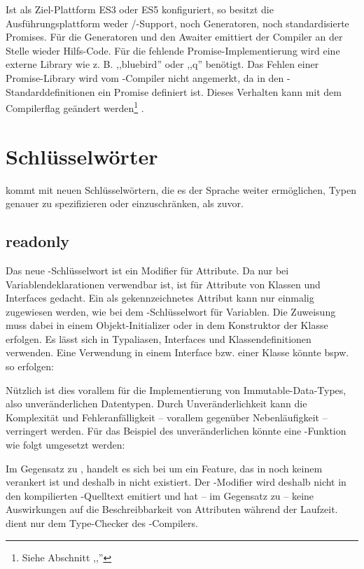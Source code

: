 Ist als Ziel-Plattform ES3 oder ES5 konfiguriert, so besitzt die Ausführungsplattform weder \tsasync/\tsawait-Support, noch Generatoren, noch standardisierte Promises. Für die Generatoren und den Awaiter emittiert der Compiler an der Stelle wieder Hilfs-Code. Für die fehlende Promise-Im\-ple\-men\-tie\-rung wird eine externe Library wie z. B. ,,bluebird'' oder ,,q'' benötigt. Das Fehlen einer Promise-Library wird vom \ts-Compiler nicht angemerkt, da in den \ts-Stan\-dard\-de\-fi\-ni\-tio\-nen ein Promise definiert ist. Dieses Verhalten kann mit dem Compilerflag  geändert werden\footnote{Siehe Abschnitt ,,''} .

\section{Schlüsselwörter}
 kommt mit neuen Schlüsselwörtern, die es der Sprache weiter ermöglichen, Typen genauer zu spezifizieren oder einzuschränken, als zuvor.

\subsection{readonly}
Das neue \tsreadonly-Schlüsselwort ist ein Modifier für Attribute. Da \tsconst nur bei Variablendeklarationen verwendbar ist, ist \tsreadonly für Attribute von Klassen und Interfaces gedacht. Ein als \tsreadonly gekennzeichnetes Attribut kann nur einmalig zugewiesen werden, wie bei dem \tsconst-Schlüsselwort für Variablen. Die Zuweisung muss dabei in einem Objekt-Initializer oder in dem Konstruktor der Klasse erfolgen. Es lässt sich in Typaliasen, Interfaces und Klassendefinitionen verwenden. Eine Verwendung in einem Interface  bzw. einer Klasse  könnte bspw. so erfolgen:


Nützlich ist dies vorallem für die Implementierung von Im\-mu\-ta\-ble-Da\-ta-Types, also unveränderlichen Datentypen. Durch Un\-ver\-än\-der\-lich\-keit kann die Komplexität und Fehleranfälligkeit -- vorallem gegenüber Nebenläufigkeit -- verringert werden. Für das Beispiel des unveränderlichen  könnte eine -Funktion wie folgt umgesetzt werden:


Im Gegensatz zu \tsconst, handelt es sich bei \tsreadonly um ein Feature, das in noch keinem \ess verankert ist und deshalb in \js nicht existiert. Der \tsreadonly-Modifier wird deshalb nicht in den kompilierten \js-Quelltext emitiert und hat -- im Gegensatz zu \tsconst -- keine Auswirkungen auf die Beschreibbarkeit von Attributen während der Laufzeit. \tsreadonly dient nur dem Type-Checker des \ts-Compilers.

